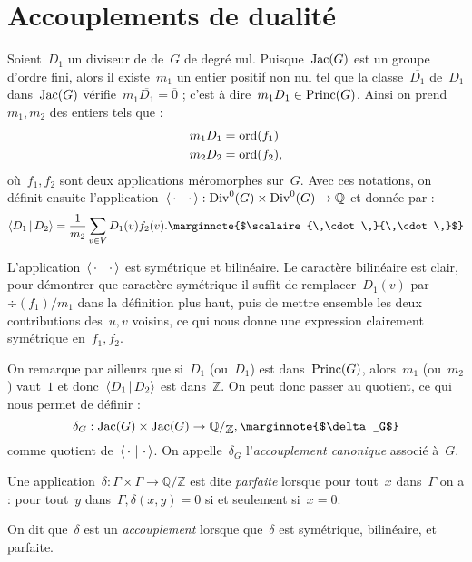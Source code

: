 \section{Accouplements de dualité}
	Soient~$D_1$ un diviseur de de~$G$ de degré nul. Puisque~$\operatorname{Jac}(G)$ est un groupe d'ordre fini, alors il existe~$m_1$ un entier positif non nul tel que la classe~$\overline{D_1}$ de~$D_1$ dans~$\operatorname{Jac}(G)$ vérifie~$m_1 \overline{D_1}=\overline{0}$ ; c'est à dire~$m_1 D_1 \in \operatorname{Princ}(G)$. Ainsi on prend~$m_1, m_2$ des entiers tels que :
	\begin{align*}
		m_1 D_1 &= \operatorname{ord}(f_1)\\
		m_2 D_2 &= \operatorname{ord}(f_2),
	\end{align*}
	où~$f_1, f_2$ sont deux applications méromorphes sur~$G$. Avec ces notations, on définit ensuite l'application~$\left<\,\cdot\,\,|\,\,\cdot\,\right> :\operatorname{Div}^0(G)\times\operatorname{Div}^0(G) \rightarrow \mathbb{Q}$ et donnée par :
	\[
		\scalaire{D_1}{D_2} = \frac{1}{m_2} \sum_{v\in V}D_1(v) f_2(v).	\text{\marginnote{$\scalaire{\,\cdot\,}{\,\cdot\,}$}}
	\]
	\begin{rem}
		L'application~$\left<\,\cdot\,\,|\,\,\cdot\,\right>$ est symétrique et bilinéaire. Le caractère bilinéaire est clair, pour démontrer que caractère symétrique il suffit de remplacer~$D_1(v)$ par~$\div(f_1)/m_1$ dans la définition plus haut, puis de mettre ensemble les deux contributions des~$u,v$ voisins, ce qui nous donne une expression clairement symétrique en~$f_1,f_2$.
	\end{rem}
	\begin{rem}
		On remarque par ailleurs que si~$D_1$ (ou~$D_1$) est dans~$\operatorname{Princ}(G)$, alors~$m_1$ (ou~$m_2$) vaut~$1$ et donc~$\left<D_1\,|\,D_2\right>$ est dans~$\mathbb{Z}$. On peut donc passer au quotient, ce qui nous permet de définir :
		\[
			\delta_G : \Jac(G)\times\Jac(G) \rightarrow \quotient{\mathbb{Q}}{\mathbb{Z}}, \text{\marginnote{$\delta_G$}}
		\]
		comme quotient de~$\left<\,\cdot\,\,|\,\,\cdot\,\right>$. On appelle~$\delta_G$ l'\emph{accouplement canonique} associé à~$G$.
	\end{rem}
	\begin{defi}
		Une application~$\delta : \Gamma\times\Gamma \rightarrow \mathbb{Q}/\mathbb{Z}$ est dite \emph{parfaite}  lorsque pour tout~$x$ dans~$\Gamma$ on a : pour tout~$y$ dans~$\Gamma, \delta(x,y) = 0$ si et seulement si~$x = 0$.
		
		On dit que~$\delta$ est un \emph{accouplement}  lorsque que~$\delta$ est symétrique, bilinéaire, et parfaite.
	\end{defi}
